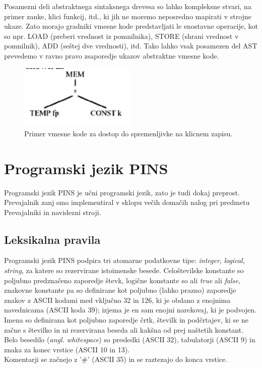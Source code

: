 \documentclass[a4paper, 12pt]{book}
\begin{document}
Posamezni deli abstraktnega sintaksnega drevesa so lahko kompleksne stvari, na primer zanke, klici funkcij, itd., ki jih ne moremo neposredno mapirati v strojne ukaze. Zato morajo gradniki vmesne kode predstavljati le enostavne operacije, kot so npr. LOAD (preberi vrednost iz pomnilnika), STORE (shrani vrednost v pomnilnik), ADD (seštej dve vrednosti), itd. Tako lahko vsak posamezen del AST prevedemo v ravno pravo zsaporedje ukazov abstraktne vmesne kode. \cite{modernCompiler} \\ 

\begin{figure}[h]
	\begin{center}
		\includegraphics[width=0.5\textwidth]{resources/ir.png}
	\end{center}
	\caption{Primer vmesne kode za dostop do spremenljivke na klicnem zapisu.}
	\label{pic1}
\end{figure}

\chapter{Programski jezik PINS}

Programski jezik PINS je učni programski jezik, zato je tudi dokaj preprost. Prevajalnik zanj smo implementiral v sklopu večih domačih nalog pri predmetu Prevajalniki in navidezni stroji.

\section{Leksikalna pravila}

Programski jezik PINS podpira tri atomarne podatkovne tipe: \textit{integer}, \textit{logical}, \textit{string}, za katere so rezervirane istoimenske besede. Celoštevilske konstante so poljubno predznačeno zaporedje števk, logične konstante so ali \textit{true} ali \textit{false}, znakovne konstante pa so definirane kot poljubno (lahko prazno) zaporedje znakov z ASCII kodami med vključno 32 in 126, ki je obdano z enojnima navednicama (ASCII koda 39); izjema je en sam enojni narekovaj, ki je podvojen. \\
\indent Imena so definirana kot poljubno zaporedje črtk, številk in podčrtajev, ki se ne začne s številko in ni rezervirana beseda ali kakšna od prej naštetih konstant. \\
\indent Belo besedilo (\textit{angl. whitespace}) so presledki (ASCII 32), tabulatorji (ASCII 9) in znaka za konec vrstice (ASCII 10 in 13). \\
\indent Komentarji se začnejo z '\#' (ASCII 35) in se raztezajo do konca vrstice.
\end{document}
